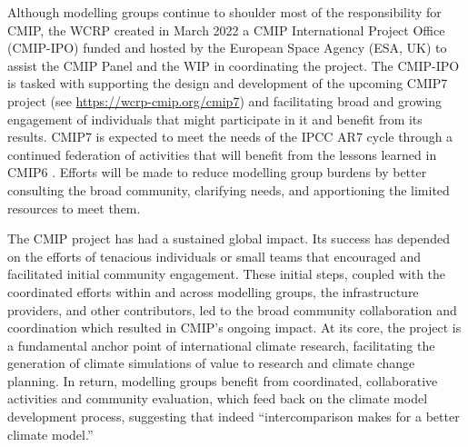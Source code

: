 \documentclass[manuscript]{copernicus}
\begin{document}
Although modelling groups continue to shoulder most of the responsibility for CMIP, the WCRP created in March 2022 a CMIP International Project Office (CMIP-IPO) funded and hosted by the European Space Agency (ESA, UK) to assist the CMIP Panel and the WIP in coordinating the project. The CMIP-IPO is tasked with supporting the design and development of the upcoming CMIP7 project (see \href{https://wcrp-cmip.org/cmip7}{https://wcrp-cmip.org/cmip7}) and facilitating broad and growing engagement of individuals that might participate in it and benefit from its results. CMIP7 is expected to meet the needs of the IPCC AR7 cycle through a continued federation of activities that will benefit from the lessons learned in CMIP6 \citep{eyring_overview_2016}. Efforts will be made to reduce modelling group burdens by better consulting the broad community, clarifying needs, and apportioning the limited resources to meet them. 

The CMIP project has had a sustained global impact. Its success has depended on the efforts of tenacious individuals or small teams that encouraged and facilitated initial community engagement. These initial steps, coupled with the coordinated efforts within and across modelling groups, the infrastructure providers, and other contributors, led to the broad community collaboration and coordination which resulted in CMIP's ongoing impact. At its core, the project is a fundamental anchor point of international climate research, facilitating the generation of climate simulations of value to research and climate change planning. In return, modelling groups benefit from coordinated, collaborative activities and community evaluation, which feed back on the climate model development process, suggesting that indeed ``intercomparison makes for a better climate model.''





\end{document}
